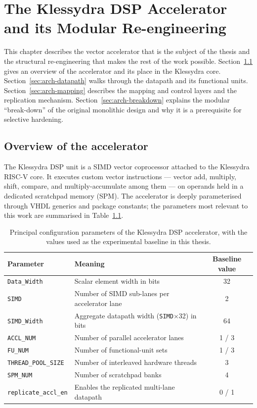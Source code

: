 \chapter{The Klessydra DSP Accelerator and its Modular Re-engineering}
\label{ch:architecture}

This chapter describes the vector accelerator that is the subject of the thesis
and the structural re-engineering that makes the rest of the work possible.
Section~\ref{sec:arch-overview} gives an overview of the accelerator and its
place in the Klessydra core. Section~\ref{sec:arch-datapath} walks through the
datapath and its functional units. Section~\ref{sec:arch-mapping} describes the
mapping and control layers and the replication mechanism.
Section~\ref{sec:arch-breakdown} explains the modular ``break-down'' of the
original monolithic design and why it is a prerequisite for selective hardening.

\section{Overview of the accelerator}
\label{sec:arch-overview}

The Klessydra DSP unit is a SIMD vector coprocessor attached to the Klessydra
RISC-V core. It executes custom vector instructions --- vector add, multiply,
shift, compare, and multiply-accumulate among them --- on operands held in a
dedicated scratchpad memory (SPM). The accelerator is deeply parameterised
through VHDL generics and package constants; the parameters most relevant to
this work are summarised in Table~\ref{tab:params}.

\begin{table}[htbp]
\centering
\caption{Principal configuration parameters of the Klessydra DSP accelerator,
with the values used as the experimental baseline in this thesis.}
\label{tab:params}
\small
\begin{tabular}{lp{8.2cm}c}
\toprule
Parameter & Meaning & Baseline value \\
\midrule
\texttt{Data\_Width}      & Scalar element width in bits                              & 32 \\
\texttt{SIMD}             & Number of SIMD sub-lanes per accelerator lane             & 2 \\
\texttt{SIMD\_Width}      & Aggregate datapath width (\texttt{SIMD}$\times$32) in bits & 64 \\
\texttt{ACCL\_NUM}        & Number of parallel accelerator lanes                      & 1 / 3 \\
\texttt{FU\_NUM}          & Number of functional-unit sets                            & 1 / 3 \\
\texttt{THREAD\_POOL\_SIZE} & Number of interleaved hardware threads                  & 3 \\
\texttt{SPM\_NUM}         & Number of scratchpad banks                                & 4 \\
\texttt{replicate\_accl\_en} & Enables the replicated multi-lane datapath             & 0 / 1 \\
\bottomrule
\end{tabular}
\end{table}

